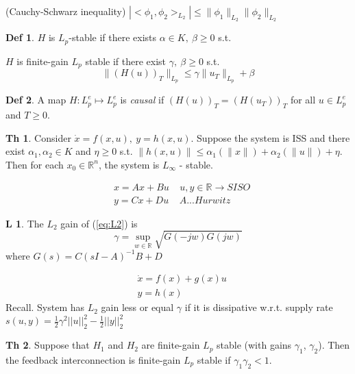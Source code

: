 \documentclass[9pt,landscape]{article}
\theoremstyle{definition}
\newtheorem*{Theorem}{Th}
\newtheorem*{Lemma}{L}
\newtheorem*{Definition}{Def}
\begin{document}
\begin{multicols}{4}
(Cauchy-Schwarz inequality) $|<\phi_1,\phi_2>_{L_2}| \leq \|\phi_1\|_{L_2}\|\phi_2\|_{L_2}$

\begin{Definition}
$H$ is $L_p$-stable if there exists $\alpha \in K, \ \beta \geq 0$ s.t. 

$H$ is finite-gain $L_p$ stable if there exist $\gamma, \ \beta \geq 0$ s.t. 
\begin{equation*}\label{finite_gain}
\|(H(u))_T\|_{L_p} \leq \gamma \|u_T\|_{L_p} + \beta 
\end{equation*}
\end{Definition}

\begin{Definition}
A map $H: L_p^e \mapsto L_p^e$ is {\it causal} if $(H(u))_T = (H(u_T))_T$ for all $u \in L_p^e$ and $T \geq 0$. 
\end{Definition}

\begin{Theorem}
Consider $\dot{x} = f(x,u), \ y = h(x,u)$. Suppose the system is ISS and there exist $\alpha_1, \alpha_2 \in K$ and $\eta \geq 0$ s.t. $\|h(x,u)\| \leq \alpha_1(\|x\|) + \alpha_2(\|u\|) + \eta$. Then for each $x_0 \in \mathbb{R}^n$, the system is $L_{\infty}$ - stable.
\end{Theorem}
\begin{equation} \label{eq:L2}
\begin{split}
&x=Ax+Bu \ \ \ \ \ u,y\in\mathbb{R}\rightarrow SISO\\
&y=Cx+Du \ \ \ \ \ A ... Hurwitz
\end{split}
\end{equation}
 \begin{Lemma}
The $L_2$ gain of (\ref{eq:L2}) is
$$\gamma=\sup_{w\in\mathbb{R}}\sqrt{G(-jw)G(jw)}$$
 where $G(s)=C(sI-A)^{-1}B+D$
 \end{Lemma}
\begin{equation} \label{eq:L2af}
\begin{split}
&\dot x = f(x) +g(x)u\\
&y = h(x)
\end{split}
\end{equation}
 Recall. System has $L_2$ gain less or equal $\gamma$ if it is dissipative w.r.t. supply
rate $s(u,y)=\frac{1}{2}\gamma^2||u||^2_2-\frac{1}{2}||y||_2^2$

\begin{Theorem}
 Suppose that $H_1$ and $H_2$ are finite-gain $L_p$ stable (with gains $\gamma_1$, $\gamma_2$).
 Then the feedback interconnection is finite-gain $L_p$ stable if $\gamma_1\gamma_2<1$.
\end{Theorem}


\end{multicols}
\end{document}
